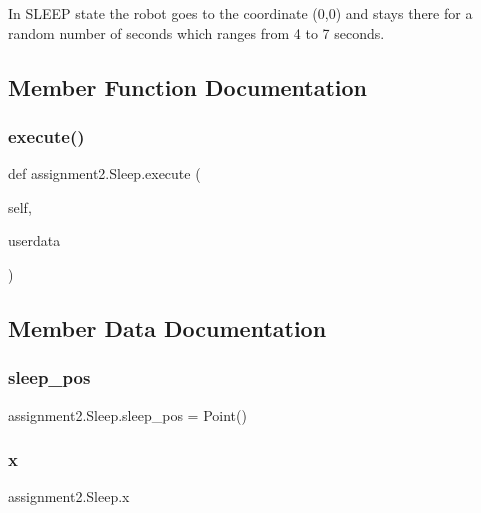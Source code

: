 \begin{DoxyVerb}In SLEEP state the robot goes to the coordinate (0,0) and stays there for a random number of seconds which ranges from 4 to 7 seconds.
\end{DoxyVerb}
 

\subsection{Member Function Documentation}
\mbox{\label{classassignment2_1_1_sleep_ad8803022105f5315bc10f3dad1efb084}} 
\subsubsection{execute()}
{\footnotesize\ttfamily def assignment2.\+Sleep.\+execute (\begin{DoxyParamCaption}\item[{}]{self,  }\item[{}]{userdata }\end{DoxyParamCaption})}



\subsection{Member Data Documentation}
\mbox{\label{classassignment2_1_1_sleep_a58f3c1f26ee24b2d82ed7c6288356014}} 
\subsubsection{sleep\+\_\+pos}
{\footnotesize\ttfamily assignment2.\+Sleep.\+sleep\+\_\+pos = Point()\hspace{0.3cm}{\ttfamily [static]}}

\mbox{\label{classassignment2_1_1_sleep_a489c90ec7fe09e77b707c0b501bc69e9}} 
\subsubsection{x}
{\footnotesize\ttfamily assignment2.\+Sleep.\+x\hspace{0.3cm}{\ttfamily [static]}}

